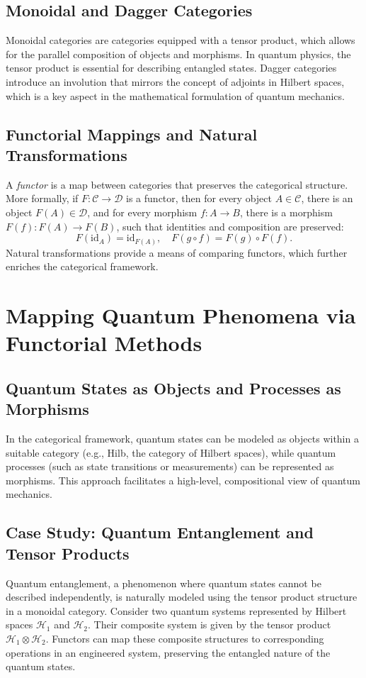 \documentclass[11pt]{article}
\begin{document}
\subsection{Monoidal and Dagger Categories}
Monoidal categories are categories equipped with a tensor product, which allows for the parallel composition of objects and morphisms. In quantum physics, the tensor product is essential for describing entangled states. Dagger categories introduce an involution that mirrors the concept of adjoints in Hilbert spaces, which is a key aspect in the mathematical formulation of quantum mechanics.

\subsection{Functorial Mappings and Natural Transformations}
A \emph{functor} is a map between categories that preserves the categorical structure. More formally, if $F: \mathcal{C} \to \mathcal{D}$ is a functor, then for every object $A \in \mathcal{C}$, there is an object $F(A) \in \mathcal{D}$, and for every morphism $f: A \to B$, there is a morphism $F(f): F(A) \to F(B)$, such that identities and composition are preserved:
\[
F(\mathrm{id}_A) = \mathrm{id}_{F(A)}, \quad F(g \circ f) = F(g) \circ F(f).
\]
Natural transformations provide a means of comparing functors, which further enriches the categorical framework.

\section{Mapping Quantum Phenomena via Functorial Methods}
\subsection{Quantum States as Objects and Processes as Morphisms}
In the categorical framework, quantum states can be modeled as objects within a suitable category (e.g., Hilb, the category of Hilbert spaces), while quantum processes (such as state transitions or measurements) can be represented as morphisms. This approach facilitates a high-level, compositional view of quantum mechanics.

\subsection{Case Study: Quantum Entanglement and Tensor Products}
Quantum entanglement, a phenomenon where quantum states cannot be described independently, is naturally modeled using the tensor product structure in a monoidal category. Consider two quantum systems represented by Hilbert spaces $\mathcal{H}_1$ and $\mathcal{H}_2$. Their composite system is given by the tensor product $\mathcal{H}_1 \otimes \mathcal{H}_2$. Functors can map these composite structures to corresponding operations in an engineered system, preserving the entangled nature of the quantum states.
\end{document}
